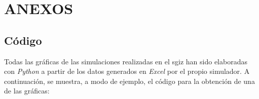 
\newpage
\section*{ANEXOS} \label{sec:anexos} %

\renewcommand{\thesubsection}{\Alph{subsection}} %
\renewcommand{\thetable}{\Alph{subsection}.\arabic{table}}
\renewcommand{\thefigure}{\Alph{subsection}.\arabic{figure}}
\renewcommand{\thecode}{\Alph{subsection}.\arabic{code}}

\setcounter{subsection}{0}
\setcounter{table}{0}
\setcounter{figure}{0}

\subsection{Código} \label{sec:codigo}

Todas las gráficas de las simulaciones realizadas en el \acrshort{sgiz} han sido elaboradas con \textit{Python} a partir de los datos generados en \textit{Excel} por el propio simulador. A continuación, se muestra, a modo de ejemplo, el código para la obtención de una de las gráficas:

\vspace{-5pt}

